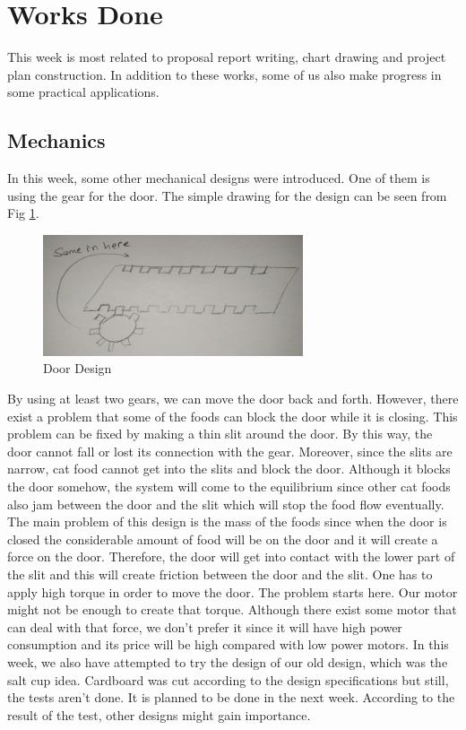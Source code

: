 \section{Works Done}
\label{sec:worksDone}
This week is most related to proposal report writing, chart drawing and project plan construction. In addition to these works, some of us also make progress in some practical applications.
\subsection{Mechanics}
In this week, some other mechanical designs were introduced. One of them is using the gear for the door. The simple drawing for the design can be seen from Fig \ref{fig:mechDoga1}.

\begin{figure}
    \centering
    \includegraphics{img/mechDoga1.png}
    \caption{Door Design}
    \label{fig:mechDoga1}
\end{figure}

By using at least two gears, we can move the door back and forth. However, there exist a problem that some of the foods can block the door while it is closing. This problem can be fixed by making a thin slit around the door. By this way, the door cannot fall or lost its connection with the gear. Moreover, since the slits are narrow, cat food cannot get into the slits and block the door. Although it blocks the door somehow, the system will come to the equilibrium since other cat foods also jam between the door and the slit which will stop the food flow eventually. 
The main problem of this design is the mass of the foods since when the door is closed the considerable amount of food will be on the door and it will create a force on the door. Therefore, the door will get into contact with the lower part of the slit and this will create friction between the door and the slit. One has to apply high torque in order to move the door. The problem starts here. Our motor might not be enough to create that torque. Although there exist some motor that can deal with that force, we don’t prefer it since it will have high power consumption and its price will be high compared with low power motors.
In this week, we also have attempted to try the design of our old design, which was the salt cup idea. Cardboard was cut according to the design specifications but still, the tests aren't done. It is planned to be done in the next week. According to the result of the test, other designs might gain importance.


